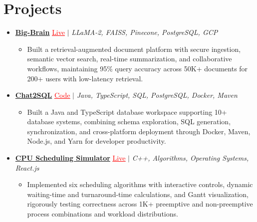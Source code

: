 \documentclass[letterpaper,10pt]{article}
\newcommand{\itemTail}{\vspace{-5pt}}
\newcommand{\projGap}{\vspace{3pt}}
\newcommand{\resumeItem}[1]{\item\small{{#1 \itemTail}}}
\newcommand{\resumeProjectHeading}[1]{\item \small #1 \vspace{-2pt}}
\newcommand{\resumeProjectLink}[2]{\href{#1}{\textcolor{red}{\underline{#2}}}}
\newcommand{\resumeSubHeadingListStart}{\begin{itemize}[leftmargin=0.0in, label={}]}
\newcommand{\resumeSubHeadingListEnd}{\end{itemize}}
\newcommand{\resumeProjItemListStart}{\begin{itemize}[leftmargin=0.15in,label=\textbullet,itemsep=3pt,topsep=0pt,parsep=0pt,partopsep=0pt]}
\newcommand{\resumeProjItemListEnd}{\end{itemize}\vspace{-4pt}}
\begin{document}
\section{Projects}
\resumeSubHeadingListStart
\vspace{-2pt}
\resumeProjectHeading{\href{https://big-brain-pied.vercel.app/}{\textbf{Big-Brain}} \resumeProjectLink{https://big-brain-pied.vercel.app/}{Live} $|$ \emph{LLaMA-2, FAISS, Pinecone, PostgreSQL, GCP}}
\resumeProjItemListStart
\resumeItem{Built a retrieval-augmented document platform with secure ingestion, semantic vector search, real-time summarization, and collaborative workflows, maintaining 95\% query accuracy across 50K+ documents for 200+ users with low-latency retrieval.}
\resumeProjItemListEnd
\projGap
\resumeProjectHeading{\href{https://github.com/SAHAJ-BHADJA/Chat2SQL}{\textbf{Chat2SQL}} \resumeProjectLink{https://github.com/SAHAJ-BHADJA/Chat2SQL}{Code} $|$ \emph{Java, TypeScript, SQL, PostgreSQL, Docker, Maven}}
\resumeProjItemListStart
\resumeItem{Built a Java and TypeScript database workspace supporting 10+ database systems, combining schema exploration, SQL generation, synchronization, and cross-platform deployment through Docker, Maven, Node.js, and Yarn for developer productivity.}
\resumeProjItemListEnd
\projGap
\resumeProjectHeading{\href{https://cpu-scheduler-amber.vercel.app/}{\textbf{CPU Scheduling Simulator}} \resumeProjectLink{https://cpu-scheduler-amber.vercel.app/}{Live} $|$ \emph{C++, Algorithms, Operating Systems, React.js}}
\resumeProjItemListStart
\resumeItem{Implemented six scheduling algorithms with interactive controls, dynamic waiting-time and turnaround-time calculations, and Gantt visualization, rigorously testing correctness across 1K+ preemptive and non-preemptive process combinations and workload distributions.}
\resumeProjItemListEnd
\resumeSubHeadingListEnd
\end{document}
